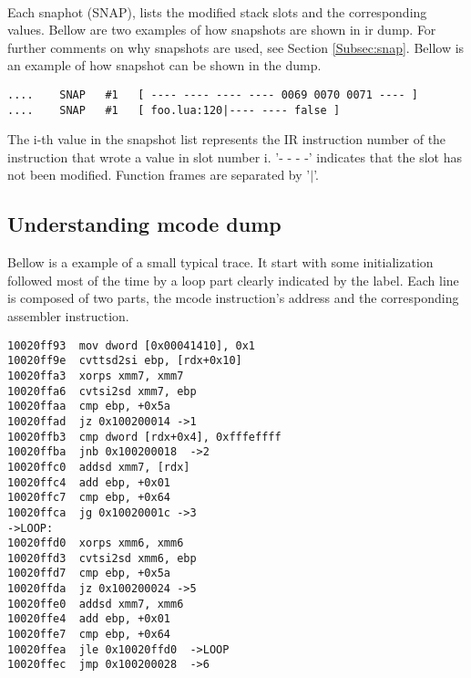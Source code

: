 \\
Each snaphot (SNAP), lists the modified stack slots and the corresponding values.
Bellow are two examples of how snapshots are shown in ir dump. For further
comments on why snapshots are used, see Section \ref{Subsec:snap}. Bellow is an
example of how snapshot can be shown in the dump.
\begin{verbatim}
....    SNAP   #1   [ ---- ---- ---- ---- 0069 0070 0071 ---- ]
....    SNAP   #1   [ foo.lua:120|---- ---- false ]
\end{verbatim}
The i-th value in the snapshot list represents the IR instruction number of the
instruction that wrote a value in slot number i. '- - - -' indicates that the slot
has not been modified. Function frames are separated by '$\vert$'.


\subsection{Understanding mcode dump}
\label{Subsec:dump-mcode}

Bellow is a example of a small typical trace. It start with some initialization
followed most of the time by a loop part clearly indicated by the label.
Each line is composed of two parts, the mcode instruction's address and the
corresponding assembler instruction.
\begin{verbatim}
10020ff93  mov dword [0x00041410], 0x1
10020ff9e  cvttsd2si ebp, [rdx+0x10]
10020ffa3  xorps xmm7, xmm7
10020ffa6  cvtsi2sd xmm7, ebp
10020ffaa  cmp ebp, +0x5a
10020ffad  jz 0x100200014 ->1
10020ffb3  cmp dword [rdx+0x4], 0xfffeffff
10020ffba  jnb 0x100200018  ->2
10020ffc0  addsd xmm7, [rdx]
10020ffc4  add ebp, +0x01
10020ffc7  cmp ebp, +0x64
10020ffca  jg 0x10020001c ->3
->LOOP:
10020ffd0  xorps xmm6, xmm6
10020ffd3  cvtsi2sd xmm6, ebp
10020ffd7  cmp ebp, +0x5a
10020ffda  jz 0x100200024 ->5
10020ffe0  addsd xmm7, xmm6
10020ffe4  add ebp, +0x01
10020ffe7  cmp ebp, +0x64
10020ffea  jle 0x10020ffd0  ->LOOP
10020ffec  jmp 0x100200028  ->6
\end{verbatim}


